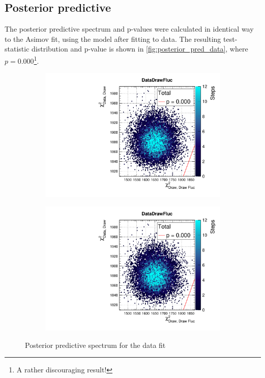 \subsection{Posterior predictive}
The posterior predictive spectrum and p-values were calculated in identical way to the Asimov fit, using the model after fitting to data. The resulting test-statistic distribution and p-value is shown in \autoref{fig:posterior_pred_data}, where $p = 0.000$\footnote{A rather discouraging result!}. 
\begin{figure}[h]
	\begin{subfigure}[t]{0.49\textwidth}
		\includegraphics[width=\textwidth, trim={0mm 0mm 0mm 11mm}, clip,page=1]{figures/mach3/data/postpred/2017b_NewData_NewDet_UpdXsecStep_2Xsec_4Det_5Flux_0_PostPred_procs}
	\end{subfigure}
	\begin{subfigure}[t]{0.49\textwidth}
		\includegraphics[width=\textwidth, trim={0mm 0mm 0mm 11mm}, clip,page=2]{figures/mach3/data/postpred/2017b_NewData_NewDet_UpdXsecStep_2Xsec_4Det_5Flux_0_PostPred_procs}
	\end{subfigure}
	\caption{Posterior predictive spectrum for the data fit}
	\label{fig:posterior_pred_data}
\end{figure}

